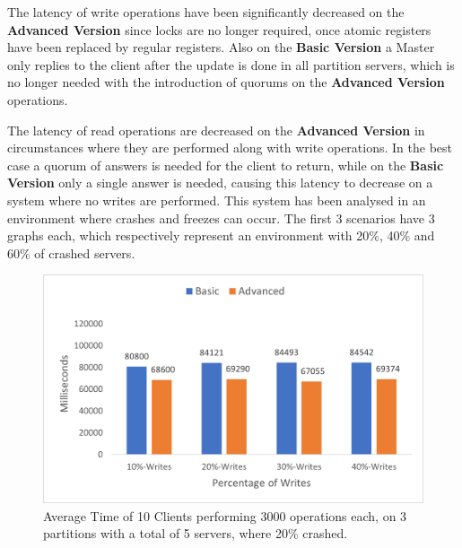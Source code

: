 \documentclass[times, 10pt,twocolumn]{article}
\begin{document}
The latency of write operations have been significantly decreased on the \textbf{Advanced Version} since locks are no longer required, once atomic registers have been replaced by regular registers. Also on the \textbf{Basic Version} a Master only replies to the client after the update is done in all partition servers, which is no longer needed with the introduction of quorums on the \textbf{Advanced Version} operations.

The latency of read operations are decreased on the \textbf{Advanced Version} in circumstances where they are performed along with write operations. In the best case a quorum of answers is needed for the client to return, while on the \textbf{Basic Version} only a single answer is needed, causing this latency to decrease on a system where no writes are performed.
This system has been analysed in an environment where crashes and freezes can occur. The first 3 scenarios have 3 graphs each, which respectively represent an environment with 20\%, 40\% and 60\% of crashed servers.
\begin{figure}[h!]
	\centering
	\includegraphics[scale=0.65]{Graphs/Client-5-20.png}
	\caption{Average Time of 10 Clients performing 3000 operations each, on 3 partitions with a total of 5 servers, where 20\% crashed.}
\end{figure}
\newpage
\end{document}
